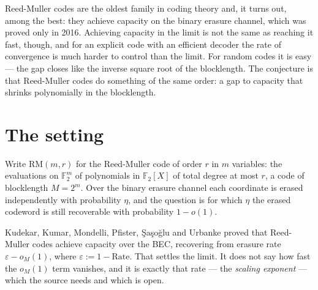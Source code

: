 \documentclass{aicr-conjecture}
\newcommand{\eps}{\varepsilon}
\newcommand{\F}{\mathbb{F}}
\newcommand{\RM}{\mathrm{RM}}
\begin{document}

\vspace{0.4em}

\begin{informalconjecture}
Reed-Muller codes are the oldest family in coding theory and, it turns
out, among the best: they achieve capacity on the binary erasure channel,
which was proved only in 2016. Achieving capacity in the limit is not the
same as reaching it fast, though, and for an explicit code with an
efficient decoder the rate of convergence is much harder to control than
the limit. For random codes it is easy --- the gap closes like the inverse
square root of the blocklength. The conjecture is that Reed-Muller codes
do something of the same order: a gap to capacity that shrinks
polynomially in the blocklength.
\end{informalconjecture}

\section{The setting}\label{sec:setting}

Write $\RM(m,r)$ for the Reed-Muller code of order $r$ in $m$ variables:
the evaluations on $\F_{2}^{m}$ of polynomials in $\F_{2}[X]$ of total
degree at most $r$, a code of blocklength $M = 2^{m}$. Over the binary
erasure channel each coordinate is erased independently with probability
$\eta$, and the question is for which $\eta$ the erased codeword is still
recoverable with probability $1 - o(1)$.

Kudekar, Kumar, Mondelli, Pfister, \c{S}a\c{s}o\u{g}lu and Urbanke proved
that Reed-Muller codes achieve capacity over the BEC\@, recovering from
erasure rate $\eps - o_{M}(1)$, where $\eps := 1 - \mathrm{Rate}$. That
settles the limit. It does not say how fast the $o_{M}(1)$ term vanishes,
and it is exactly that rate --- the \emph{scaling exponent} --- which the
source needs and which is open.
\end{document}
